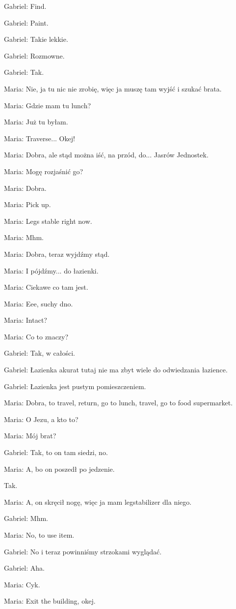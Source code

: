 Gabriel: Find.

Gabriel: Paint.

Gabriel: Takie lekkie.

Gabriel: Rozmowne.

Gabriel: Tak.

Maria: Nie, ja tu nic nie zrobię, więc ja muszę tam wyjść i szukać brata.

Maria: Gdzie mam tu lunch?

Maria: Już tu byłam.

Maria: Traverse... Okej!

Maria: Dobra, ale stąd można iść, na przód, do... Jasrów Jednostek.

Maria: Mogę rozjaśnić go?

Maria: Dobra.

Maria: Pick up.

Maria: Legs stable right now.

Maria: Mhm.

Maria: Dobra, teraz wyjdźmy stąd.

Maria: I pójdźmy... do łazienki.

Maria: Ciekawe co tam jest.

Maria: Eee, suchy dno.

Maria: Intact?

Maria: Co to znaczy?

Gabriel: Tak, w całości.

Gabriel: Łazienka akurat tutaj nie ma zbyt wiele do odwiedzania łazience.

Gabriel: Łazienka jest pustym pomieszczeniem.

Maria: Dobra, to travel, return, go to lunch, travel, go to food supermarket.

Maria: O Jezu, a kto to?

Maria: Mój brat?

Gabriel: Tak, to on tam siedzi, no.

Maria: A, bo on poszedł po jedzenie.

Tak.

Maria: A, on skręcił nogę, więc ja mam legstabilizer dla niego.

Gabriel: Mhm.

Maria: No, to use item.

Gabriel: No i teraz powinniśmy strzokami wyglądać.

Gabriel: Aha.

Maria: Cyk.

Maria: Exit the building, okej.

